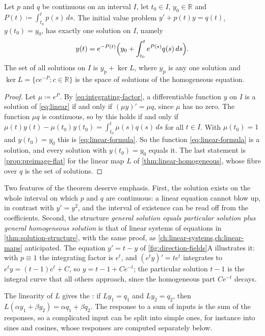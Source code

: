 \begin{theorem}
\label{thm:linear-first-order}
Let $p$ and $q$ be continuous on an interval $I$, let $t_0\in I$, $y_0\in\mathbb R$ and $P(t)\coloneqq\int_{t_0}^tp(s)\,ds$. The initial value problem $y'+p(t)y=q(t)$, $y(t_0)=y_0$, has exactly one solution on $I$, namely
\begin{equation}
y(t)=e^{-P(t)}\Bigl(y_0+\int_{t_0}^te^{P(s)}q(s)\,ds\Bigr).
\label{eq:linear-formula}
\end{equation}
The set of all solutions on $I$ is $y_{\mathrm p}+\ker L$, where $y_{\mathrm p}$ is any one solution and $\ker L=\{ce^{-P}:c\in\mathbb R\}$ is the space of solutions of the homogeneous equation.
\end{theorem}

\begin{proof}
Let $\mu\coloneqq e^P$. By \eqref{eq:integrating-factor}, a differentiable function $y$ on $I$ is a solution of \eqref{eq:linear} if and only if $(\mu y)'=\mu q$, since $\mu$ has no zero. The function $\mu q$ is continuous, so by  this holds if and only if $\mu(t)y(t)-\mu(t_0)y(t_0)=\int_{t_0}^t\mu(s)q(s)\,ds$ for all $t\in I$. With $\mu(t_0)=1$ and $y(t_0)=y_0$ this is \eqref{eq:linear-formula}. So the function \eqref{eq:linear-formula} is a solution, and every solution with $y(t_0)=y_0$ equals it. The last statement is \cref{prop:preimage-flat} for the linear map $L$ of \cref{thm:linear-homogeneous}, whose fibre over $q$ is the set of solutions.
\end{proof}

Two features of the theorem deserve emphasis. First, the solution exists on the whole interval on which $p$ and $q$ are continuous: a linear equation cannot blow up, in contrast with $y'=y^2$, and the interval of existence can be read off from the coefficients. Second, the structure \emph{general solution equals particular solution plus general homogeneous solution} is that of linear systems of equations in \cref{thm:solution-structure}, with the same proof, as \cref{ch:linear-systems,ch:linear-maps} anticipated. The equation $y'=t-y$ of \cref{fig:direction-fields}A illustrates it: with $p\equiv1$ the integrating factor is $e^t$, and $(e^ty)'=te^t$ integrates to $e^ty=(t-1)e^t+C$, so $y=t-1+Ce^{-t}$; the particular solution $t-1$ is the integral curve that all others approach, since the homogeneous part $Ce^{-t}$ decays.

The linearity of $L$ gives the : if $Ly_1=q_1$ and $Ly_2=q_2$, then $L(\alpha y_1+\beta y_2)=\alpha q_1+\beta q_2$. The response to a sum of inputs is the sum of the responses, so a complicated input can be split into simple ones, for instance into sines and cosines, whose responses are computed separately below.

